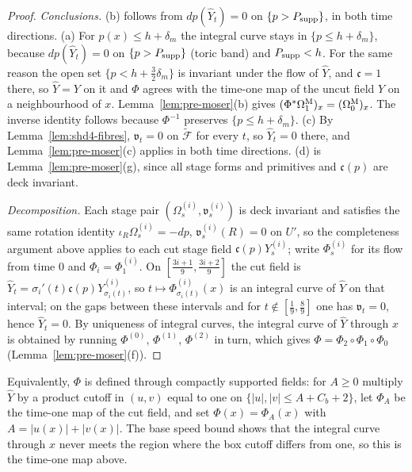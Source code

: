 \begin{proof}
\emph{Conclusions.} (b) follows from $dp(\widehat Y_t)=0$ on $\{p>P_{\rm supp}\}$, in both time directions. (a) For
$p(x)\le h+\delta_m$ the integral curve stays in $\{p\le h+\delta_m\}$, because $dp(\widehat Y_t)=0$ on $\{p>P_{\rm supp}\}$ (toric band)
and $P_{\rm supp}<h$. For the same reason the open set $\{p<h+\frac32\delta_m\}$ is invariant under the flow of $\widehat Y$, and
$\mathfrak c=1$ there, so $\widehat Y=Y$ on it and $\Phi$ agrees with the time-one map of the uncut field $Y$ on a neighbourhood of $x$.
Lemma~\ref{lem:pre-moser}(b) gives $(\Phi^*\Omega^{\rm M}_1)_x=(\Omega^{\rm M}_0)_x$. The inverse identity follows because
$\Phi^{-1}$ preserves $\{p\le h+\delta_m\}$. (c) By Lemma~\ref{lem:shd4-fibres}, $\mathfrak v_t=0$ on $\widetilde{\mathcal F}$ for every $t$,
so $\widehat Y_t=0$ there, and Lemma~\ref{lem:pre-moser}(c) applies in both time directions. (d) is
Lemma~\ref{lem:pre-moser}(g), since all stage forms and primitives and $\mathfrak c(p)$ are deck invariant.

\emph{Decomposition.} Each stage pair $(\Omega^{(i)}_s,\mathfrak v^{(i)}_s)$ is deck invariant and satisfies the same
rotation identity $\iota_R\Omega^{(i)}_s=-dp$, $\mathfrak v^{(i)}_s(R)=0$ on $U'$, so the completeness argument above applies
to each cut stage field $\mathfrak c(p)Y^{(i)}_s$; write $\Phi^{(i)}_s$ for its flow from time $0$ and $\Phi_i=\Phi^{(i)}_1$. On
$[\frac{3i+1}9,\frac{3i+2}9]$ the cut field is $\widehat Y_t=\sigma_i'(t)\mathfrak c(p)Y^{(i)}_{\sigma_i(t)}$, so
$t\mapsto\Phi^{(i)}_{\sigma_i(t)}(x)$ is an integral curve of $\widehat Y$ on that interval; on the gaps between these
intervals and for $t\notin[\frac19,\frac89]$ one has $\mathfrak v_t=0$, hence $\widehat Y_t=0$. By uniqueness of integral
curves, the integral curve of $\widehat Y$ through $x$ is obtained by running $\Phi^{(0)}$, $\Phi^{(1)}$, $\Phi^{(2)}$ in turn,
which gives $\Phi=\Phi_2\circ\Phi_1\circ\Phi_0$ (Lemma~\ref{lem:pre-moser}(f)).
\end{proof}

Equivalently, $\Phi$ is defined through compactly supported fields: for $A\ge0$ multiply $\widehat Y$ by a product
cutoff in $(u,v)$ equal to one on $\{|u|,|v|\le A+C_b+2\}$, let $\Phi_A$ be the time-one map of the cut field, and set $\Phi(x)=\Phi_A(x)$ with $A=|u(x)|+|v(x)|$. The base
speed bound shows that the integral curve through $x$ never meets the region where the box cutoff differs from one, so
this is the time-one map above.

